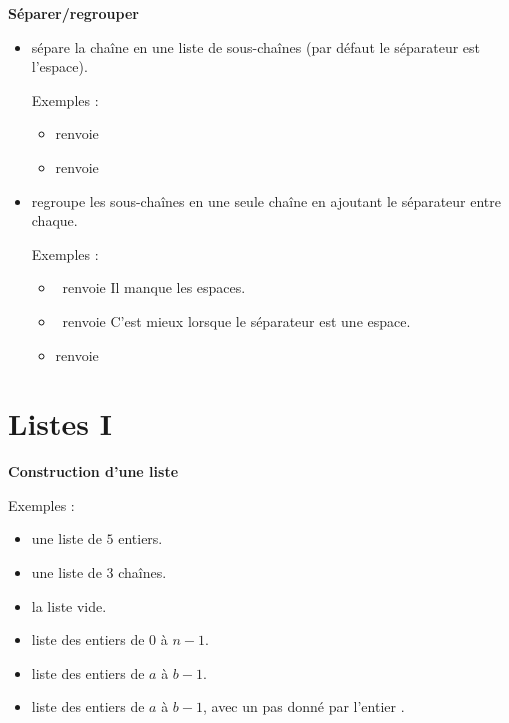 \documentclass[11pt,class=report,crop=false]{standalone}
\begin{document}
\bigskip

\textbf{Séparer/regrouper}

\begin{itemize}
  \item {} \quad sépare la chaîne en une liste de sous-chaînes (par défaut le séparateur est l'espace).
  
  Exemples : 
  \begin{itemize}  
    \item {} \quad renvoie 
    \item {} \quad renvoie \ci{['12.5', '17.5', '18']}
  \end{itemize}   
  
   \item {} \quad regroupe les sous-chaînes en une seule chaîne en ajoutant le séparateur entre chaque.

   Exemples :
  \begin{itemize}  
    \item {} \  renvoie  Il manque les espaces.
    \item {} \ renvoie    C'est mieux lorsque le séparateur est une espace.
    \item {}  renvoie
    
  \end{itemize} 
  
  

\end{itemize}


\section{Listes I}

\textbf{Construction d'une liste}

Exemples :
\begin{itemize}
    \item {} \quad une liste de $5$ entiers.
    \item {} \quad une liste de $3$ chaînes.
    \item {} \quad la liste vide.
    \item {} \quad liste des entiers de $0$ à $n-1$.
    \item {} \quad liste des entiers de $a$ à $b-1$.
    \item {} \quad liste des entiers de $a$ à $b-1$, avec un pas donné par l'entier .
  \end{itemize}
  
\end{document}
